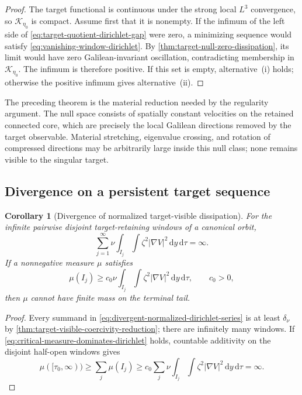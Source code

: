 \documentclass[11pt]{amsart}
\numberwithin{equation}{section}
\theoremstyle{plain}
\newtheorem{corollary}[corollary]{Corollary}
\theoremstyle{definition}
\theoremstyle{remark}
\newcommand{\dd}{\,\mathrm d}
\begin{document}
\begin{proof}
The target functional is continuous under the strong local \(L^3\)
convergence, so \(\mathcal K_{\eta_0}\) is compact.  Assume first that it is
nonempty.  If the infimum of the
left side of \eqref{eq:target-quotient-dirichlet-gap} were zero, a minimizing
sequence would satisfy \eqref{eq:vanishing-window-dirichlet}.  By
\cref{thm:target-null-zero-dissipation}, its limit would have zero
Galilean-invariant oscillation, contradicting membership in
\(\mathcal K_{\eta_0}\).  The infimum is therefore positive.  If this set is
empty, alternative~\textup{(i)} holds; otherwise the positive infimum gives
alternative~\textup{(ii)}.
\end{proof}

The preceding theorem is the material reduction needed by the regularity
argument.  The null space consists of spatially constant velocities on the
retained connected core, which are precisely the local Galilean directions
removed by the target observable.  Material stretching, eigenvalue crossing,
and rotation of compressed directions may be arbitrarily large inside this
null class; none remains visible to the singular target.

\subsection{Divergence on a persistent target sequence}
\label{app:target-visible-dissipation-divergence}

\begin{corollary}[Divergence of normalized target-visible dissipation]
\label{cor:target-visible-dissipation-divergence}
For the infinite pairwise disjoint target-retaining windows of a canonical
orbit,
\begin{equation}\label{eq:divergent-normalized-dirichlet-series}
 \sum_{j=1}^{\infty}
 \nu\int_{I_j}\int\zeta^2|\nabla V|^2\dd y\dd\tau
 =\infty.
\end{equation}
If a nonnegative measure \(\mu\) satisfies
\begin{equation}\label{eq:critical-measure-dominates-dirichlet}
 \mu(I_j)\ge c_0\nu
 \int_{I_j}\int\zeta^2|\nabla V|^2\dd y\dd\tau,
 \qquad c_0>0,
\end{equation}
then \(\mu\) cannot have finite mass on the terminal tail.
\end{corollary}

\begin{proof}
Every summand in \eqref{eq:divergent-normalized-dirichlet-series} is at least
\(\delta_\nu\) by
\cref{thm:target-visible-coercivity-reduction}; there are infinitely many
windows.  If \eqref{eq:critical-measure-dominates-dirichlet} holds,
countable additivity on the disjoint half-open windows gives
\[
 \mu([\tau_0,\infty))
 \ge\sum_j\mu(I_j)
 \ge c_0\sum_j\nu
       \int_{I_j}\int\zeta^2|\nabla V|^2\dd y\dd\tau
 =\infty.
\]
\end{proof}
\end{document}
